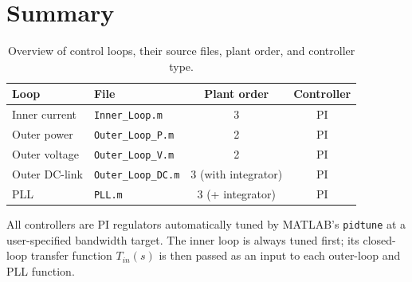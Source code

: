 \documentclass[12pt, a4paper]{article}
\begin{document}
\section{Summary}

\begin{table}[h!]
\centering
\renewcommand{\arraystretch}{1.6}
\begin{tabular}{llcc}
\toprule
\textbf{Loop} & \textbf{File} & \textbf{Plant order} & \textbf{Controller} \\
\midrule
Inner current   & \texttt{Inner\_Loop.m}    & 3 & PI \\
Outer power     & \texttt{Outer\_Loop\_P.m} & 2 & PI \\
Outer voltage   & \texttt{Outer\_Loop\_V.m} & 2 & PI \\
Outer DC-link   & \texttt{Outer\_Loop\_DC.m}& 3 (with integrator) & PI \\
PLL             & \texttt{PLL.m}            & 3 (+ integrator)    & PI \\
\bottomrule
\end{tabular}
\caption{Overview of control loops, their source files, plant order, and controller type.}
\end{table}

All controllers are PI regulators automatically tuned by MATLAB's
\texttt{pidtune} at a user-specified bandwidth target.  The inner loop is always
tuned first; its closed-loop transfer function $T_{in}(s)$ is then passed as an
input to each outer-loop and PLL function.
\end{document}
